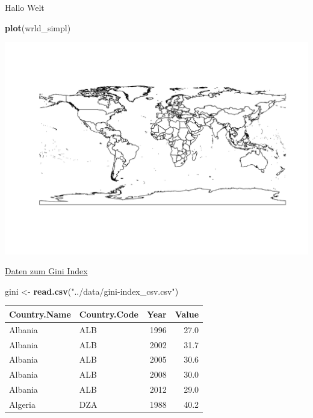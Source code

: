 \documentclass[ignorenonframetext,]{beamer}
\newenvironment{Shaded}{\begin{snugshade}}{\end{snugshade}}
\newcommand{\KeywordTok}[1]{\textcolor[rgb]{0.13,0.29,0.53}{\textbf{#1}}}
\newcommand{\NormalTok}[1]{#1}
\newcommand{\StringTok}[1]{\textcolor[rgb]{0.31,0.60,0.02}{#1}}
\begin{document}
\begin{frame}[fragile]{Hallo Welt}
\protect\hypertarget{hallo-welt}{}

\begin{Shaded}
\begin{Highlighting}[]
\KeywordTok{plot}\NormalTok{(wrld_simpl)}
\end{Highlighting}
\end{Shaded}

\includegraphics{Choroplethen_files/figure-beamer/unnamed-chunk-3-1.pdf}

\end{frame}

\begin{frame}[fragile]{\href{https://datahub.io/core/gini-index\#data}{Daten
zum Gini Index}}
\protect\hypertarget{daten-zum-gini-index}{}

\begin{Shaded}
\begin{Highlighting}[]
\NormalTok{gini <-}\StringTok{ }\KeywordTok{read.csv}\NormalTok{(}\StringTok{"../data/gini-index_csv.csv"}\NormalTok{)}
\end{Highlighting}
\end{Shaded}

\begin{longtable}[]{@{}llrr@{}}
\toprule
Country.Name & Country.Code & Year & Value\tabularnewline
\midrule
\endhead
Albania & ALB & 1996 & 27.0\tabularnewline
Albania & ALB & 2002 & 31.7\tabularnewline
Albania & ALB & 2005 & 30.6\tabularnewline
Albania & ALB & 2008 & 30.0\tabularnewline
Albania & ALB & 2012 & 29.0\tabularnewline
Algeria & DZA & 1988 & 40.2\tabularnewline
\bottomrule
\end{longtable}

\end{frame}
\end{document}
